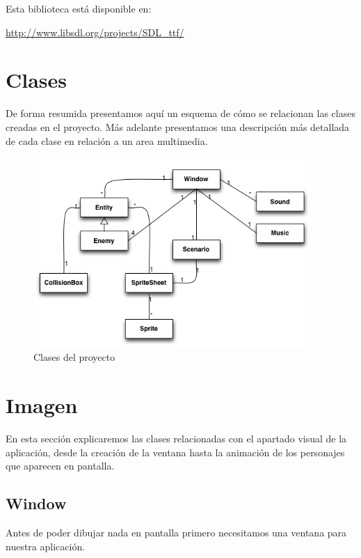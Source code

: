 \documentclass[parskip=half*]{scrartcl}
\begin{document}
	Esta biblioteca est\'a disponible en: \\

	\centerline{\url{http://www.libsdl.org/projects/SDL_ttf/}}


\section{Clases}
De forma resumida presentamos aqu\'i un esquema de c\'omo se relacionan las clases creadas en el proyecto. M\'as adelante presentamos una descripci\'on m\'as detallada de cada clase en relaci\'on a un area multimedia.

\begin{figure}[h]
	\centering
	\includegraphics[width=400]{uml_clases.png}
	\caption{Clases del proyecto}
\end{figure}


\newpage
\section{Imagen}
En esta secci\'on explicaremos las clases relacionadas con el apartado visual de la aplicaci\'on, desde la creaci\'on de la ventana hasta la animaci\'on de los personajes que aparecen en pantalla.
	\subsection{Window}
	Antes de poder dibujar nada en pantalla primero necesitamos una ventana para nuestra aplicaci\'on.
\end{document}
